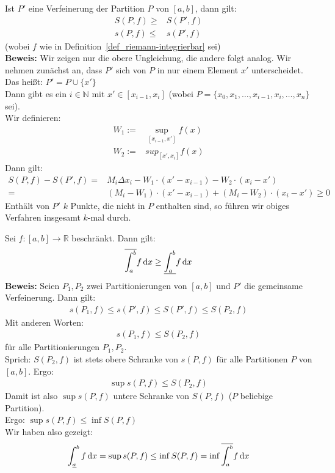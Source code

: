 \begin{Satz}{\label{kap09_satz16}
	Ist $P'$ eine Verfeinerung der Partition $P$ von $[a,b]$, dann gilt:
	\begin{align*}
		S (P,f) \geq & S (P',f) \\
		s(P,f) \leq & s(P',f)
	\end{align*}
	(wobei $f$ wie in Definition~\ref{def_riemann-integrierbar}
	sei) \\
	\textbf{Beweis:} Wir zeigen nur die obere Ungleichung, die andere folgt analog. 
	Wir nehmen zunächst an, dass $P'$ sich von $P$ in nur einem Element $x'$ 
	unterscheidet. Das heißt: $P' = P \cup \{x'\}$ \\
	Dann gibt es ein $i \in \mathbb{N}$ mit $x' \in [x_{i-1}, x_i]$ \newline
	(wobei $P = \{x_0, x_1, \hdots, x_{i-1}, x_i, \hdots, x_n \}$ sei).\\
	Wir definieren:
	\begin{align*}
		W_1 := & \sup_{[x_{i-1}, x']} f(x) \\
		W_2 := & sup_{[x', x_i]} f(x)
	\end{align*}
	Dann gilt: 
	\begin{align*}
		S(P,f) - S(P',f) = &M_i \Delta x_i - W_1\cdot (x' - x_{i-1}) - 
		W_2\cdot (x_i - x') \\
		= & (M_i -W_1) \cdot (x' - x_{i-1}) 
		+ (M_i - W_2)\cdot(x_i - x') \geq 0
	\end{align*}
	 Enthält von $P'$ $k$ Punkte, die nicht in $P$ enthalten sind, so führen wir 
	 obiges Verfahren insgesamt $k$-mal durch. 
	
}\end{Satz}

\begin{Satz}{\label{kap09_satz17}
	Sei $f: [a,b] \rightarrow \mathbb{R}$ beschränkt. Dann gilt:
	\begin{align*}
		\overline{\int_{a}^{b}} f \dd{x} \geq \underline{\int_{a}^{b}} f \dd{x}
	\end{align*}
	\textbf{Beweis:} Seien $P_1, P_2$ zwei Partitionierungen von $[a,b]$ und 
	$P'$ die gemeinsame Verfeinerung. Dann gilt:
	\begin{align*}
		s(P_1,f) \leq s(P',f) \leq S(P',f) \leq S(P_2, f) 
	\end{align*}
	Mit anderen Worten:
	\begin{align*}
		s(P_1, f) \leq S(P_2, f)
	\end{align*}
	für alle Partitionierungen $P_1, P_2$. \\
	Sprich: $S(P_2,f)$ ist stets obere Schranke von $s(P,f)$ für alle Partitionen 
	$P$ von $[a,b]$. Ergo:
	\begin{align*}
		\sup s(P,f) \leq S (P_2, f)
	\end{align*}
	Damit ist also $\sup s(P,f)$ untere Schranke von $S(P,f)$ ($P$ beliebige 
	Partition). \\
	Ergo: $\sup s(P,f) \leq \inf S (P,f)$  \\
	Wir haben also gezeigt:
	\begin{align*}
		\int_{\underline{a}}^b f \dd{x} = \sup s(P,f) \leq 
		\inf S(P,f) = \inf \overline{\int_{a}^{b}} f \dd{x} 
	\end{align*}
}\end{Satz}